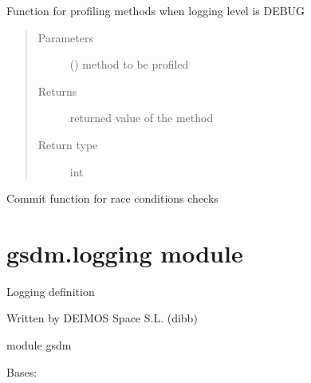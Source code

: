 \begin{fulllineitems}
\label{\detokenize{gsdm:gsdm.debugging.debug}}
Function for profiling methods when logging level is DEBUG
\begin{quote}\begin{description}
\item[{Parameters}] \leavevmode
{} () \textendash{} method to be profiled

\item[{Returns}] \leavevmode
returned value of the method

\item[{Return type}] \leavevmode
int

\end{description}\end{quote}

\end{fulllineitems}


\begin{fulllineitems}
\label{\detokenize{gsdm:gsdm.debugging.race_condition}}
Commit function for race conditions checks

\end{fulllineitems}



\section{gsdm.logging module}
\label{\detokenize{gsdm:module-gsdm.logging}}\label{\detokenize{gsdm:gsdm-logging-module}}
Logging definition

Written by DEIMOS Space S.L. (dibb)

module gsdm

\begin{fulllineitems}
\label{\detokenize{gsdm:gsdm.logging.Log}}
Bases: 

\begin{fulllineitems}
\label{\detokenize{gsdm:gsdm.logging.Log.define_logging_configuration}}
\end{fulllineitems}


\end{fulllineitems}



